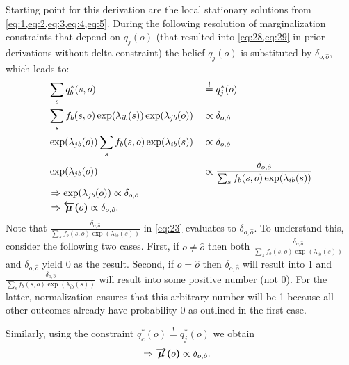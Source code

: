 Starting point for this derivation are the local stationary solutions from \cref{eq:1,eq:2,eq:3,eq:4,eq:5}. During the following resolution of marginalization constraints that depend on \(q_j(o)\) (that resulted into \cref{eq:28,eq:29} in prior derivations without delta constraint) the belief \(q_j(o)\) is substituted by \(\delta_{o,\hat o}\), which leads to:
\begin{alignat}{2}
     & \sum_s q_b^*(s,o)                                                                           &  & \overset{!}{=} q_j^*(o)                                                               \\
     & \sum_s f_b(s,o) \exp(\lambda_{ib}(s)) \exp(\lambda_{jb}(o))                                 &  & \propto \delta_{o,\hat o}                                                             \\
     & \exp(\lambda_{jb}(o)) \sum_s f_b(s,o) \exp(\lambda_{ib}(s))                                 &  & \propto \delta_{o,\hat o}                                                             \\
     & \exp(\lambda_{jb}(o))                                                                       &  & \propto \frac{\delta_{o,\hat o}}{\sum_s f_b(s,o) \exp(\lambda_{ib}(s))} \label{eq:23} \\
     & \Rightarrow \exp(\lambda_{jb}(o))              \propto \delta_{o,\hat o}                                                                                                               \\
     & \Rightarrow \textcolor{black}{\bm{\overleftarrow{\mu}(}o\bm{)}}  \propto \delta_{o,\hat o}.
\end{alignat}
Note that \(\frac{\delta_{o,\hat o}}{\sum_s f_b(s,o) \exp(\lambda_{ib}(s))}\) in \cref{eq:23} evaluates to \(\delta_{o,\hat o}\). To understand this, consider the following two cases. First, if \(o \neq \hat o\) then both \(\frac{\delta_{o,\hat o}}{\sum_s f_b(s,o) \exp(\lambda_{ib}(s))}\) and \(\delta_{o,\hat o}\) yield 0 as the result. Second, if \(o = \hat o\) then \(\delta_{o,\hat o}\) will result into 1 and \(\frac{\delta_{o,\hat o}}{\sum_s f_b(s,o) \exp(\lambda_{ib}(s))}\) will result into some positive number (not 0). For the latter, normalization ensures that this arbitrary number will be 1 because all other outcomes already have probability 0 as outlined in the first case.

Similarly, using the constraint \(q_c^*(o) \overset{!}{=} q_j^*(o)\) we obtain
\begin{alignat}{2}
     & \Rightarrow \textcolor{black}{\bm{\overrightarrow{\mu}(}o\bm{)}}  \propto \delta_{o,\hat o}.
\end{alignat}

